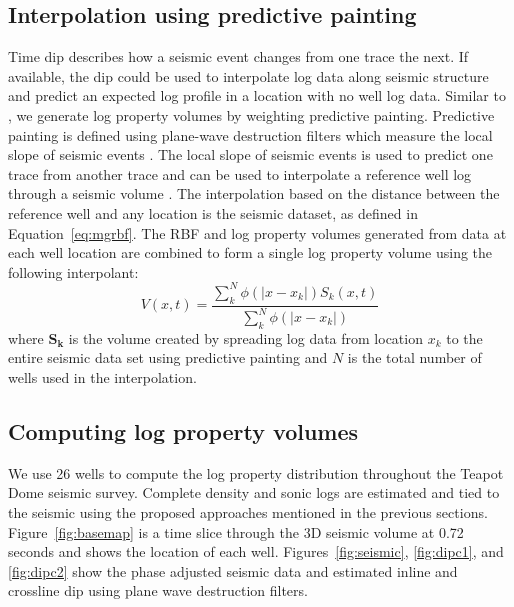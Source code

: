 \subsection{Interpolation using predictive painting}
Time dip describes how a seismic event changes from one trace  the next. If available, the  dip could be used to interpolate log data along seismic structure and predict an expected log profile in a location with no well log data. Similar to \cite{karimi2015image}, we generate log property volumes by weighting predictive painting. Predictive painting is defined using plane-wave destruction filters which measure the local slope of seismic events \cite[]{fomel2002applications}. The local slope of seismic events is used to predict one trace from another trace and can be used to interpolate a reference well log through a seismic volume  \cite[]{fomel2010predictive}. The interpolation based on the distance between the reference well and any location is the seismic dataset, as defined in Equation~\ref{eq:mgrbf}. The RBF and log property volumes generated from data at each well location are combined to form a single log property volume using the following interpolant:
\begin{equation} \label{eq:interp}
V(x,t) = \dfrac{\sum_{k}^{N}\phi(|x - x_k|)S_k(x,t)}{\sum_{k}^{N}\phi(|x - x_k|)}
\end{equation}
where $\mathbf{S_{k}}$ is the volume created by spreading log data from location $x_k$ to the entire seismic data set using predictive painting and $N$ is the total number of wells used in the interpolation.

\subsection{Computing log property volumes}
We use 26 wells to compute the log property distribution throughout the Teapot Dome seismic survey. Complete density and sonic logs are estimated and tied to the seismic using the proposed approaches mentioned in the previous sections.
Figure~\ref{fig:basemap} is a time slice through the 3D seismic volume at 0.72 seconds and shows the location of each well. Figures~\ref{fig:seismic}, \ref{fig:dipc1}, and \ref{fig:dipc2} show the phase adjusted seismic data and estimated inline and crossline dip using plane wave destruction filters.


